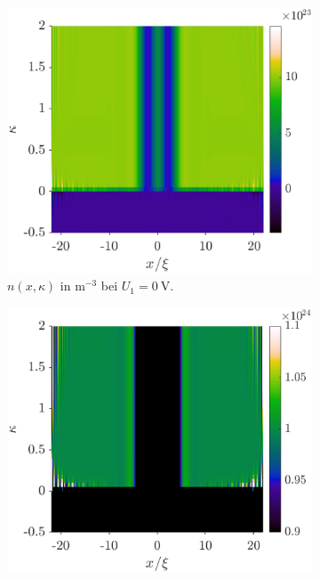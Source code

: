 
\begin{figure}
    \centering
    \begin{subfigure}[b]{0.48\textwidth}
        \centering
        \includegraphics[width=\textwidth]{plots/kappa/kappa_variation_0V_n.eps}
        \caption[]%
        {{\small $n(x,\kappa)$ in m$^{-3}$ bei $U_1=\SI{0}{\volt}$.}}
    \end{subfigure}
    \hfill
    \begin{subfigure}[b]{0.48\textwidth}
        \centering
        \includegraphics[width=\textwidth]{plots/kappa/kappa_variation_0V_n_zoomed.eps}

\end{subfigure}
\end{figure}
